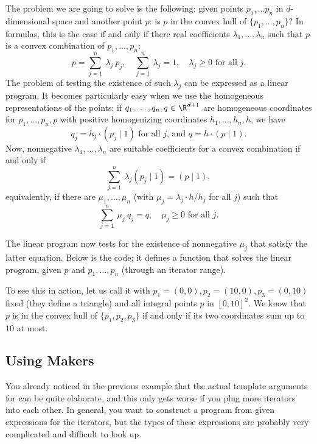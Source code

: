 The problem we are going to solve is the following: given points
$p_1,\ldots p_{n}$ in $d$-dimensional space and another point $p$: is
$p$ in the convex hull of $\{p_1,\ldots,p_{n}\}$? In formulas, this is
the case if and only if there real coefficients
$\lambda_1,\ldots,\lambda_n$ such that $p$ is a convex combination of
$p_1,\ldots,p_n$: 
\[
p = \sum_{j=1}^{n}~\lambda_j~p_j, \quad \sum_{j=1}^{n}~\lambda_j = 1,
\quad \lambda_j \geq 0 \mbox{~for all $j$.}
\]
The problem of testing the existence of such $\lambda_j$ can 
be expressed as a linear program. It becomes particularly easy
when we use the homogeneous representations of the points: if
$q_1,\ldots,q_n,q\in\R^{d+1}$ are homogeneous coordinates for
$p_1,\ldots,p_n,p$ with positive homogenizing coordinates 
$h_1,\ldots,h_n,h$, we have
\[q_j = h_j \cdot (p_j \mid 1) \mbox{~for all $j$, and~} q = h \cdot
(p\mid 1).\] Now, nonnegative $\lambda_1,\ldots,\lambda_n$ are
suitable coefficients for a convex combination if and only if
\[\sum_{j=1}^n~ \lambda_j(p_j \mid 1) = (p\mid 1), \]
equivalently, if there are $\mu_1,\ldots,\mu_n$ 
(with $\mu_j = \lambda_j \cdot h/{h_j}$ for all $j$) such that
\[
\sum_{j=1}^n~\mu_j~q_j = q, \quad \mu_j \geq 0\mbox{~for all $j$}.
\]

The linear program now tests for the existence of nonnegative $\mu_j$
that satisfy the latter equation. Below is the code; it defines a
function that solves the linear program, given $p$ and
$p_1,\ldots,p_n$ (through an iterator range).


To see this in action, let us call it with $p_1=(0,0), p_2=(10,0),
p_3=(0,10)$ fixed (they define a triangle) and all integral points $p$
in $[0,10]^2$. We know that $p$ is in the convex hull of
$\{p_1,p_2,p_3\}$ if and only if its two coordinates sum up to $10$ at
most.


\subsection{Using Makers}
You already noticed in the previous example that the actual 
template arguments for 
can be quite elaborate, and this only gets worse if you plug more 
iterators into each other. In general, you want to construct a 
program from given expressions for the iterators, but the
types of these expressions are probably very complicated and 
difficult to look up. 

